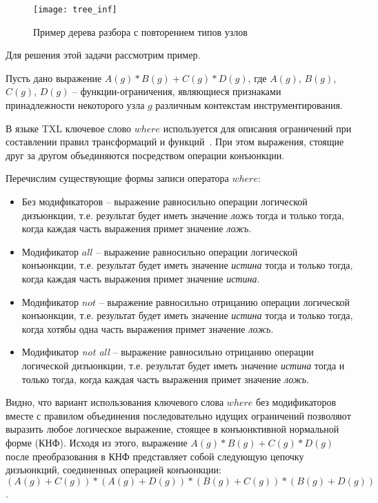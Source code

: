 \begin{figure}[!h]
	\centering
	\texttt{[image: tree\_inf]}
	\caption{Пример дерева разбора с повторением типов узлов}
	\label{fig:tree-inf}
\end{figure}

Для решения этой задачи рассмотрим пример.

Пусть дано выражение $A(g) * B(g) + C(g) * D(g)$, где $A(g)$, $B(g)$, $C(g)$, $D(g)$ -- функции-ограничения, являющиеся признаками принадлежности некоторого узла $g$ различным контекстам инструментирования.

В языке TXL ключевое слово $where$ используется для описания ограничений при составлении правил трансформаций и функций~\cite{txl-book}.
При этом выражения, стоящие друг за другом объединяются посредством операции конъюнкции.

Перечислим существующие формы записи оператора $where$:
\begin{itemize}[noitemsep]
  \item Без модификаторов -- выражение равносильно операции логической дизъюнкции, т.е. результат будет иметь значение \textit{ложь} тогда и только тогда, когда каждая часть выражения примет значение \textit{ложь}.
  \item Модификатор $all$ -- выражение равносильно операции логической конъюнкции, т.е. результат будет иметь значение \textit{истина} тогда и только тогда, когда каждая часть выражения примет значение \textit{истина}.
  \item Модификатор $not$ -- выражение равносильно отрицанию операции логической конъюнкции, т.е. результат будет иметь значение \textit{истина} тогда и только тогда, когда хотябы одна часть выражения примет значение \textit{ложь}.
  \item Модификатор \textit{not all} -- выражение равносильно отрицанию операции логической дизъюнкции, т.е. результат будет иметь значение \textit{истина} тогда и только тогда, когда каждая часть выражения примет значение \textit{ложь}.
\end{itemize}

Видно, что вариант использования ключевого слова $where$ без модификаторов вместе с правилом объединения последовательно идущих ограничений позволяют выразить любое логическое выражение, стоящее в конъюнктивной нормальной форме (КНФ).
Исходя из этого, выражение $A(g) * B(g) + C(g) * D(g)$ после преобразования в КНФ представляет собой следующую цепочку дизъюнкций, соединенных операцией конъюнкции: $(A(g) + C(g)) * (A(g) + D(g)) * (B(g) + C(g)) * (B(g) + D(g))$.

